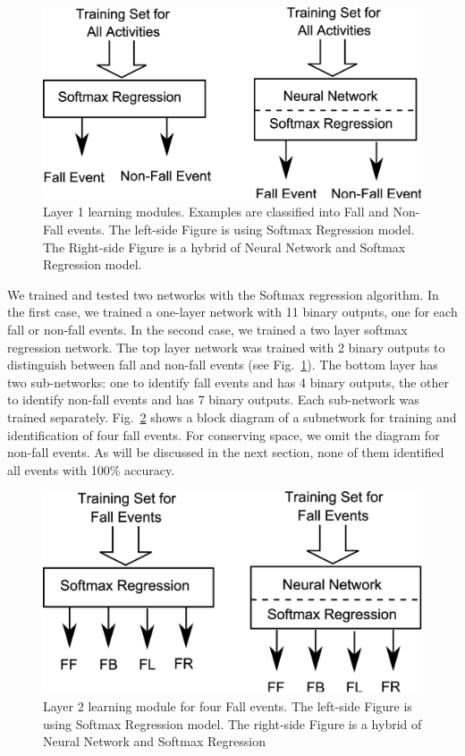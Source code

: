 \documentclass[]{IEEEtran}
\begin{document}
\begin{figure}[htbp]
	\centering
		\includegraphics[width=0.98\columnwidth]{figures/SoftmaxLayer1.eps}
	\caption{Layer 1 learning modules. Examples are classified into Fall and Non-Fall events.  The left-side Figure is using Softmax Regression model. The Right-side Figure is a hybrid of Neural Network and Softmax Regression model.}
	\label{fig:SoftmaxLayer1}
\end{figure}

We trained and tested two networks with the Softmax regression algorithm. In the first case, we trained a one-layer network with 11 binary outputs, one for each fall or non-fall events. In the second case, we trained a two layer softmax regression network. The top layer network was trained with 2 binary outputs to distinguish between fall and non-fall events (see Fig.~\ref{fig:SoftmaxLayer1}). The bottom layer has two sub-networks:  one to identify fall events and has 4 binary outputs, the other to identify non-fall events and has 7 binary outputs. Each sub-network was trained separately. Fig.~\ref{fig:SoftmaxLayer2Fall} shows a block diagram of a subnetwork for training and identification of four fall events. For conserving space, we omit the diagram for non-fall events. As will be discussed in the next section, none of them identified all events with 100\% accuracy.

\begin{figure}[htbp]
	\centering
		\includegraphics[width=0.98\columnwidth]{figures/SoftmaxLayer2Fall.eps}
	\caption{Layer 2 learning module for four Fall events. The left-side Figure is using Softmax Regression model. The right-side Figure is a hybrid of Neural Network and Softmax Regression }
	\label{fig:SoftmaxLayer2Fall}
\end{figure}
\end{document}
